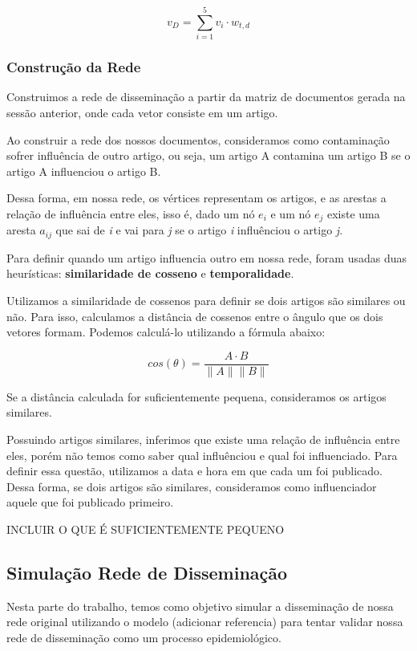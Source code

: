 \documentclass[a4paper,12pt]{article}
\begin{document}
  $$v_{D} = \sum_{i=1}^{5} v_{i} \cdot w_{t,d} $$


\subsubsection{Construção da Rede}

 Construimos a rede de disseminação a partir da matriz de documentos gerada na sessão anterior, onde cada vetor consiste em um artigo.
 
 Ao construir a rede dos nossos documentos,
 consideramos como contaminação sofrer influência de outro artigo, ou seja, um artigo A contamina um artigo B se o artigo A influenciou o
 artigo B.
 
 Dessa forma, em nossa rede, os vértices representam os artigos, e as arestas a relação de influência entre eles, isso é, dado um nó $e_{i}$ e um nó
 $e_{j}$ existe uma aresta $a_{ij}$ que sai de \textit{i} e vai para \textit{j} se o artigo \textit{i} influênciou o artigo \textit{j}.
 
 Para definir quando um artigo influencia outro em nossa rede, foram usadas duas heurísticas: \textbf{similaridade de cosseno} e 
 \textbf{temporalidade}.
 
 Utilizamos a similaridade de cossenos para definir se dois artigos são similares ou não. Para isso, calculamos a distância de cossenos
 entre o ângulo que os dois vetores formam. Podemos calculá-lo utilizando a fórmula abaixo:
 
 $$ cos(\theta) = \dfrac{A \cdot B}{\parallel A\parallel \parallel B \parallel} $$
 
 Se a distância calculada for suficientemente pequena, consideramos os artigos similares.
 
 Possuindo artigos similares, inferimos que existe uma relação de influência entre eles, 
 porém não temos como saber qual influênciou e qual foi influenciado. Para definir essa questão, utilizamos a data e hora em que
 cada um foi publicado. Dessa forma, se dois artigos são similares, consideramos como influenciador aquele que foi publicado primeiro. 

 
 INCLUIR O QUE É SUFICIENTEMENTE PEQUENO 
 
\subsection{Simulação Rede de Disseminação}

Nesta parte do trabalho, temos como objetivo simular a disseminação de nossa rede original utilizando o modelo (adicionar referencia)
para tentar validar nossa rede de disseminação como um processo epidemiológico.
\end{document}
